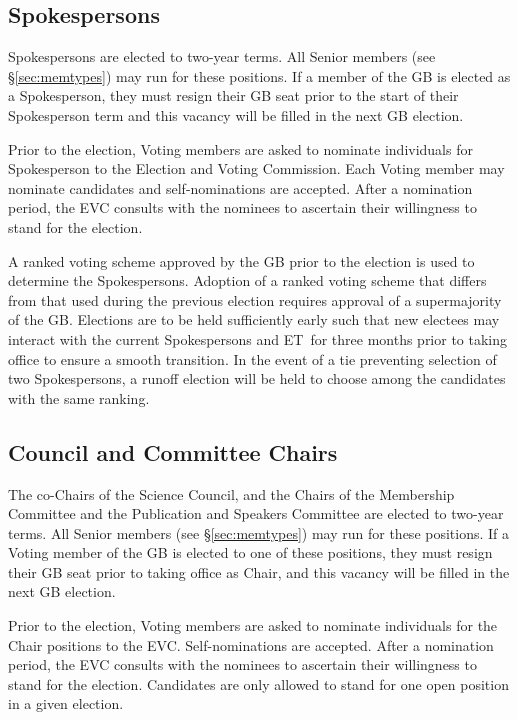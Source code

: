 \documentclass[12pt]{article}
\newcommand{\exec}{{Executive Team}}
\newcommand{\shorte}{{ET}}  %
\begin{document}
\subsection{Spokespersons}

Spokespersons are elected to two-year terms. All Senior members (see \S\ref{sec:memtypes}) may run for these positions.  If a member of the GB is elected as a Spokesperson, they must resign their GB seat prior to the start of their Spokesperson term and this vacancy will be filled in the next GB election. 

Prior to the election, Voting members are asked to nominate individuals for Spokesperson to the Election and Voting Commission. Each Voting member may nominate candidates and self-nominations are accepted. After a nomination period, the EVC consults with the nominees to ascertain their willingness to stand for the election.

A ranked voting scheme approved by the GB prior to the election is used to determine the Spokespersons.  Adoption of a ranked voting scheme that differs from that used during the previous election requires approval of a supermajority of the GB.  Elections are to be held sufficiently early such that new electees may interact with the current Spokespersons and \shorte\ for three months prior to taking office to ensure a smooth transition. In the event of a tie preventing selection of two Spokespersons, a runoff election will be held to choose among the candidates with the same ranking. 

\subsection{Council and Committee Chairs}

The co-Chairs of the Science Council, and the Chairs of the Membership Committee and the Publication and Speakers Committee are elected to two-year terms. All Senior members (see \S\ref{sec:memtypes}) may  run for these positions.  If a Voting member of the GB is elected to one of these positions, they must resign their GB seat prior to taking office as Chair, and this vacancy will be filled in the next GB election. 

Prior to the election, Voting members are asked to nominate individuals for the Chair positions to the EVC. Self-nominations are accepted. After a nomination period, the EVC consults with the nominees to ascertain their willingness to stand for the election. Candidates are only allowed to stand for one open position in a given election.  
\end{document}
